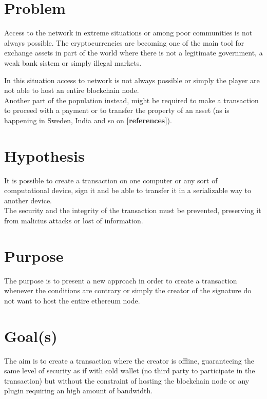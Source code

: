 \documentclass[paper=a4, fontsize=11pt]{scrartcl} %
\numberwithin{equation}{section} %
\numberwithin{figure}{section} %
\numberwithin{table}{section} %
\begin{document}
\section{Problem}

Access to the network in extreme situations or among poor communities is not always possible. The cryptocurrencies are becoming one of the main tool for exchange assets in part of the world where there is not a legitimate government, a weak bank sistem or simply illegal markets.

In this situation access to network is not always possible or simply the player are not able to host an entire blockchain node. \\

Another part of the population instead, might be required to make a transaction to proceed with a payment or to transfer the property of an asset (as is happening in Sweden, India and so on \textbf{[references]}).

\section{Hypothesis}
It is possible to create a transaction on one computer or any sort of computational device, sign it and be able to transfer it in a serializable way to another device. \\

The security and the integrity of the transaction must be prevented, preserving it from malicius attacks or lost of information.

\section{Purpose}

The purpose is to present a new approach in order to create a transaction whenever the conditions are contrary or simply the creator of the signature do not want to host the entire ethereum node.


\section{Goal(s)}

The aim is to create a transaction where the creator is offline, guaranteeing the same level of security as if with cold wallet (no third party to participate in the transaction) but without the constraint of hosting the blockchain node or any plugin requiring an high amount of bandwidth.
\end{document}
